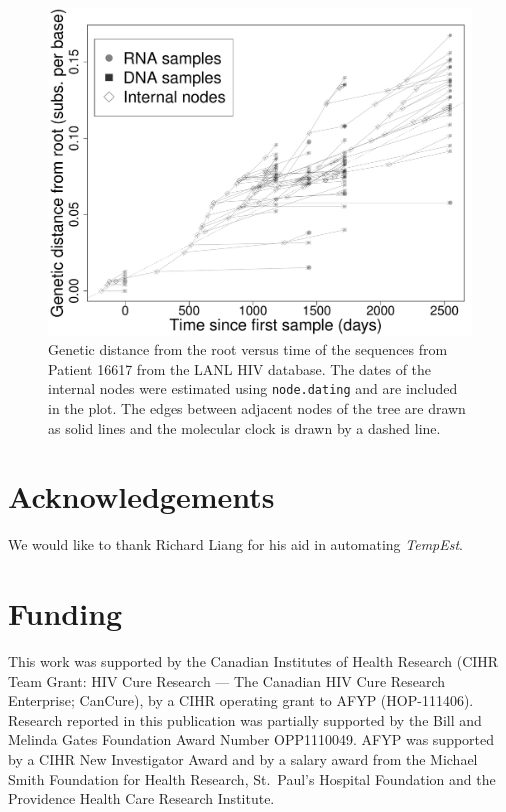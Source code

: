 \documentclass{bioinfo}
\newcommand{\code}[1]{{\tt #1}}
\begin{document}
\begin{figure}[b]
	\centering
	\includegraphics[width=\columnwidth]{Patient_16617_gray}
	\caption[Genetic distance versus time plot]{Genetic distance from the root versus time of the sequences from Patient 16617 from the LANL HIV database. The dates of the internal nodes were estimated using \code{node.dating} and are included in the plot. The edges between adjacent nodes of the tree are drawn as solid lines and the molecular clock is drawn by a dashed line.}
	\label{fig:pat16617}
\end{figure}


\section*{Acknowledgements} \label{sec:ackn}
We would like to thank Richard Liang for his aid in automating \emph{TempEst}.

\section*{Funding} \label{sec:fund}
This work was supported by the Canadian Institutes of Health Research (CIHR Team Grant: HIV Cure Research --- The Canadian HIV Cure Research Enterprise; CanCure), by a CIHR operating grant to AFYP (HOP-111406).
Research reported in this publication was partially supported by the Bill and Melinda Gates Foundation Award Number OPP1110049.
AFYP was supported by a CIHR New Investigator Award and by a salary award from the Michael Smith Foundation for Health Research, St.~Paul's Hospital Foundation and the Providence Health Care Research Institute.



\end{document}
